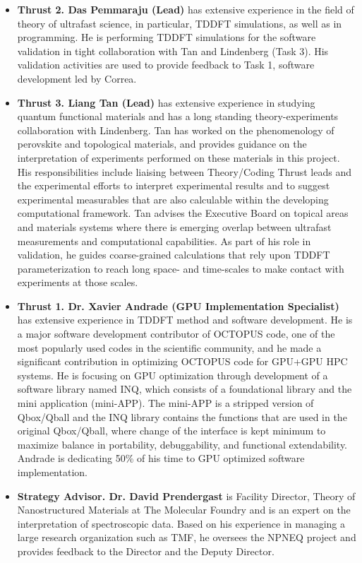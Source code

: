 \begin{itemize}
    \item[]{\bf Thrust 2. Das Pemmaraju (Lead)} has extensive experience in the field of theory of ultrafast science, in particular, TDDFT simulations, as well as in programming. He is performing TDDFT simulations for the software validation in tight collaboration with Tan and Lindenberg (Task 3). His validation activities are used to provide feedback to Task 1, software development led by Correa. 
    
    \item[]{\bf Thrust 3. Liang Tan (Lead)} has extensive experience in studying quantum functional materials and has a long standing theory-experiments collaboration with Lindenberg. Tan has worked on the phenomenology of perovskite and topological materials, and provides guidance on the interpretation of experiments performed on these materials in this project. His responsibilities include liaising between Theory/Coding Thrust leads and the experimental efforts to interpret experimental results and to suggest experimental measurables that are also calculable within the developing computational framework. Tan advises the Executive Board on topical areas and materials systems where there is emerging overlap between ultrafast measurements and computational capabilities. As part of his role in validation, he guides coarse-grained calculations that rely upon TDDFT parameterization to reach long space- and time-scales to make contact with experiments at those scales.
    
    \item[]{\bf Thrust 1. Dr. Xavier Andrade (GPU Implementation Specialist)} has extensive experience in TDDFT method and software development. He is a major software development contributor of OCTOPUS code, one of the most popularly used codes in the scientific community, and he made a significant contribution in optimizing OCTOPUS code for GPU+GPU HPC systems. He is focusing on GPU optimization through development of a software library named INQ, which consists of a foundational library and the mini application (mini-APP). The mini-APP is a stripped version of Qbox/Qball and the INQ library contains the functions that are used in the original Qbox/Qball, where change of the interface is kept minimum to maximize balance in portability, debuggability, and functional extendability. Andrade is dedicating 50\% of his time to GPU optimized software implementation.
    
    \item[]{\bf Strategy Advisor. Dr. David Prendergast} is Facility Director, Theory of Nanostructured Materials at The Molecular Foundry and is an expert on the interpretation of spectroscopic data. Based on his experience in managing a large research organization such as TMF, he oversees the NPNEQ project and provides feedback to the Director and the Deputy Director. 
\end{itemize}
\clearpage